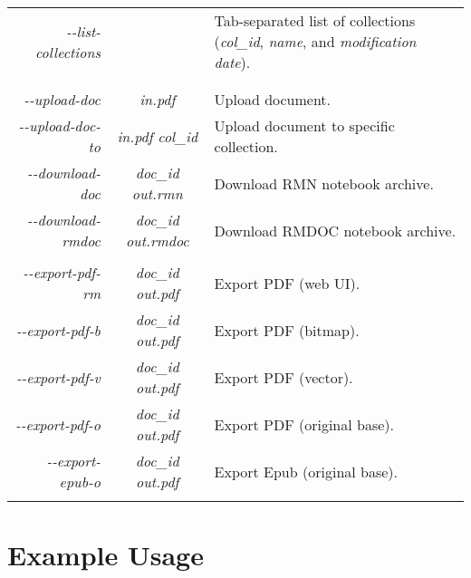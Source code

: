 \begin{longtable}{ r | c | l }
\textit{\--\--list-collections} & & Tab-separated list of collections (\textit{col\_id}, \textit{name}, and \textit{modification date}). \\
&&\\
\pagebreak
&&\\
\textit{\--\--upload-doc} & \textit{in.pdf} & Upload document. \\
\textit{\--\--upload-doc-to} & \textit{in.pdf \hspace{0.2cm} col\_id} & Upload document to specific collection. \\
\textit{\--\--download-doc} & \textit{doc\_id \hspace{0.2cm} out.rmn} & Download RMN notebook archive. \\
\textit{\--\--download-rmdoc} & \textit{doc\_id \hspace{0.2cm} out.rmdoc} & Download RMDOC notebook archive. \\
&&\\
\textit{\--\--export-pdf-rm} & \textit{doc\_id \hspace{0.2cm} out.pdf} & Export PDF (web UI). \\
\textit{\--\--export-pdf-b} & \textit{doc\_id \hspace{0.2cm} out.pdf} & Export PDF (bitmap). \\
\textit{\--\--export-pdf-v} & \textit{doc\_id \hspace{0.2cm} out.pdf} & Export PDF (vector). \\
\textit{\--\--export-pdf-o} & \textit{doc\_id \hspace{0.2cm} out.pdf} & Export PDF (original base). \\
\textit{\--\--export-epub-o} & \textit{doc\_id \hspace{0.2cm} out.pdf} & Export Epub (original base). \\
&&\\
\end{longtable}

\vspace{0.5cm}

\section{Example Usage}


